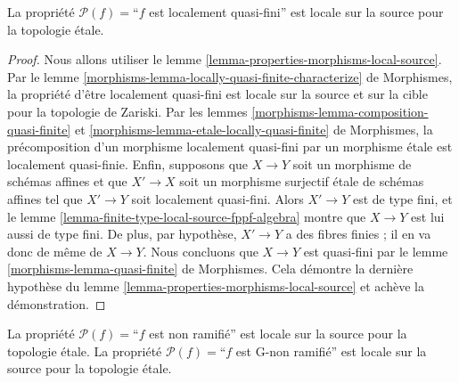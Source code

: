 \begin{lemma}
\label{lemma-locally-quasi-finite-etale-local-source}
La propriété $\mathcal{P}(f)=$``$f$ est localement quasi-fini''
est locale sur la source pour la topologie \'etale.
\end{lemma}

\begin{proof}
Nous allons utiliser le
lemme \ref{lemma-properties-morphisms-local-source}.
Par le lemme \ref{morphisms-lemma-locally-quasi-finite-characterize} de
Morphismes, la propriété d'être localement quasi-fini est locale sur la source
et sur la cible pour la topologie de Zariski. Par les lemmes
\ref{morphisms-lemma-composition-quasi-finite} et
\ref{morphisms-lemma-etale-locally-quasi-finite} de Morphismes,
la précomposition d'un morphisme localement quasi-fini par un morphisme
\'etale est localement quasi-finie.
Enfin, supposons que $X \to Y$ soit un morphisme de schémas affines et que
$X' \to X$ soit un morphisme surjectif \'etale de schémas affines tel que
$X' \to Y$ soit localement quasi-fini. Alors $X' \to Y$ est de type fini, et
le lemme \ref{lemma-finite-type-local-source-fppf-algebra}
montre que $X \to Y$ est lui aussi de type fini.
De plus, par hypothèse, $X' \to Y$ a des fibres finies ; il en va donc de même
de $X \to Y$. Nous concluons que $X \to Y$ est quasi-fini par
le lemme \ref{morphisms-lemma-quasi-finite} de Morphismes.
Cela démontre la dernière hypothèse du
lemme \ref{lemma-properties-morphisms-local-source}
et achève la démonstration.
\end{proof}

\begin{lemma}
\label{lemma-unramified-etale-local-source}
La propriété $\mathcal{P}(f)=$``$f$ est non ramifié''
est locale sur la source pour la topologie \'etale.
La propriété $\mathcal{P}(f)=$``$f$ est G-non ramifié''
est locale sur la source pour la topologie \'etale.
\end{lemma}

